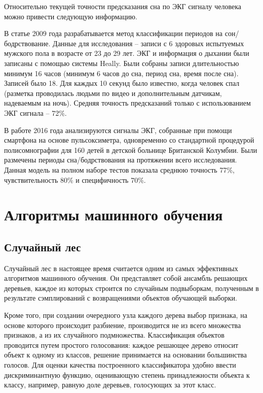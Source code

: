 Относительно текущей точности предсказания сна по ЭКГ сигналу человека можно привести следующую информацию.

В статье \cite{sleep_accuracy_3} 2009 года разрабатывается метод классификации периодов на сон/бодрствование. Данные для исследования -- записи с 6 здоровых испытуемых мужского пола в возрасте от 23 до 29 лет. ЭКГ и информация о дыхании были записаны с помощью системы Heally. Были собраны записи длительностью минимум 16 часов  (минимум 6 часов до сна, период сна, время после сна). Записей было 18. Для каждых 10 секунд было известно, когда человек спал (разметка проводилась людьми по видео и дополнительным датчикам, надеваемым на ночь). Средняя точность предсказаний только с использованием ЭКГ сигнала -- 72\%.

В работе \cite{sleep_accuracy_2} 2016 года анализируются сигналы ЭКГ, собранные при помощи смартфона на основе пульсоксиметра, одновременно со стандартной процедурой полисомнографии для 160 детей в детской больнице Британской Колумбии. Были размечены периоды сна/бодрствования на протяжении всего исследования. Данная модель на полном наборе тестов показала среднюю точность 77\%, чувствительность 80\% и специфичность 70\%.

\section{Алгоритмы машинного обучения}
\subsection{Случайный лес}

Случайный лес \cite{random_forest} в настоящее время считается одним из самых эффективных алгоритмов машинного обучения. Он представляет собой ансамбль решающих деревьев, каждое из которых строится по случайным подвыборкам, полученным в результате сэмплирований с возвращениями объектов обучающей выборки.

Кроме того, при создании очередного узла каждого дерева выбор признака, на основе которого происходит разбиение, производится не из всего множества признаков, а из их случайного подмножества. Классификация объектов проводится путем простого голосования: каждое решающее дерево относит объект к одному из классов, решение принимается на основании большинства голосов. Для оценки качества построенного классификатора удобно ввести дискриминантную функцию, оценивающую степень принадлежности объекта к классу, например, равную доле деревьев, голосующих за этот класс.

